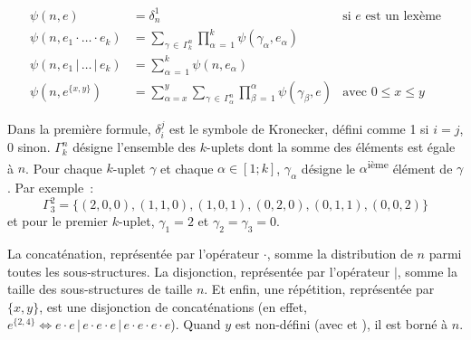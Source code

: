 \begin{align*}
%
\psi(n, e) & =
    \delta_n^1
    &
    \text{si $e$ est un lexème}
    \\
%
\psi(n, e_1 \cdot \dotso \cdot e_k) & =
    \sum_{\gamma \,\in\, \Gamma_k^n}
    \prod_{\alpha \,=\, 1}^k
    \psi(\gamma_\alpha, e_\alpha)
    \\
%
\psi(n, e_1 \,\vert\, \dots \,\vert\, e_k) & =
    \sum_{\alpha \,=\, 1}^k
    \psi(n, e_\alpha)
    \\
%
\psi(n, e^{\{x, y\}}) & =
    \sum_{\alpha = x}^y
    \sum_{\gamma \,\in\, \Gamma_\alpha^n}
    \prod_{\beta \,=\, 1}^\alpha
    \psi(\gamma_\beta, e)
    &
    \text{avec $0 \leq x \leq y$}
%
\end{align*}

Dans la première formule, $\delta_i^j$ est le symbole de Kronecker, défini
comme 1 si $i = j$, 0 sinon. $\Gamma_k^n$ désigne l'ensemble des $k$-uplets dont
la somme des éléments est égale à $n$. Pour chaque $k$-uplet $\gamma$ et chaque
$\alpha \in [1; k]$, $\gamma_\alpha$ désigne le $\alpha$\textsuperscript{ième}
élément de $\gamma$.
%
Par exemple~:
%
$$\Gamma_3^2 = \{(2, 0, 0), (1, 1, 0), (1, 0, 1), (0, 2, 0), (0, 1, 1), (0, 0,
2)\}$$
%
et pour le premier $k$-uplet, $\gamma_1 = 2$ et $\gamma_2 = \gamma_3 = 0$.

La concaténation, représentée par l'opérateur $\cdot$, somme la distribution de
$n$ parmi toutes les sous-structures. La disjonction, représentée par
l'opérateur $\vert$, somme la taille des sous-structures de taille $n$. Et
enfin, une répétition, représentée par $\{x, y\}$, est une disjonction de
concaténations (en effet, $e^{\{2,4\}} \Longleftrightarrow e \cdot e \,\vert\, e
\cdot e \cdot e \,\vert\, e \cdot e \cdot e \cdot e$). Quand $y$ est non-défini
(avec \code{*} et \code{+}), il est borné à $n$.


